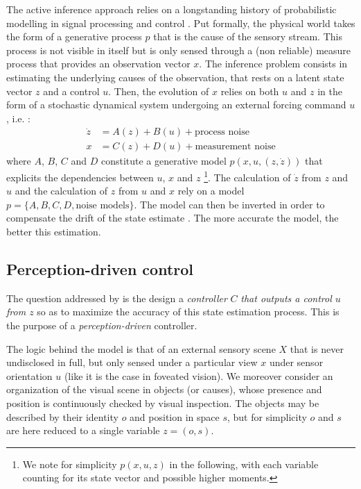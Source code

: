 \documentclass{article} %
\begin{document}
The active inference approach relies on a longstanding history of probabilistic modelling in signal processing and control \cite{Kalman1960,Baum1966,friston1994statistical}.  Put formally, the physical world  takes the form of a generative process $p$ that is the cause of the sensory stream. This process is not visible in itself but is only sensed through a (non reliable) measure process that provides an observation vector $x$. The inference problem consists in estimating the underlying causes of the observation, that rests on a latent state vector $z$ and a control $u$.  Then, the evolution of $x$ relies on both $u$ and $z$ in the form of a stochastic dynamical system undergoing an external forcing command $u$, i.e. :
\begin{align}
\dot{z} &= A(z) + B(u) + \text{process noise}\label{eq:kalman-process}\\
x &= C(z) + D(u) + \text{measurement noise} \label{eq:kalman-measure}
\end{align}  
where $A$, $B$, $C$ and $D$ constitute a generative model $p(x,u,(z,\dot{z}))$ that explicits the dependencies between $u$, $x$ and $z$ \footnote{We note for simplicity $p(x,u,z)$ in the following, with each variable counting for its state vector and possible higher moments.}. 
The calculation of $\dot{z}$ from $z$ and $u$ and the calculation of $z$ from $u$ and $x$ rely on a model $p = \{A,B,C,D,\text{noise models}\}$. The model can then be inverted in order to compensate the drift of the state estimate \cite{Kalman1960,Baum1966}. The more accurate the model, the better this estimation. 

\subsection{Perception-driven control}
The question addressed by \cite{friston2012perceptions} is the design a \emph{controller} $C$ \emph{that outputs a control $u$ from $z$} so as to maximize the accuracy of this state estimation process. This is the purpose of a \emph{perception-driven} controller.

The logic behind the model is that of an external sensory scene $X$ that is never undisclosed in full, but only sensed under a particular view $x$ under sensor orientation $u$ (like it is the case in foveated vision). 
We moreover consider an organization of the visual scene in objects (or causes), whose presence and position is continuously checked by visual inspection. The objects may be described by their identity $o$ and position in space $s$, but for simplicity $o$ and $s$ are here reduced to a single variable $z = (o, s)$. 
\end{document}
